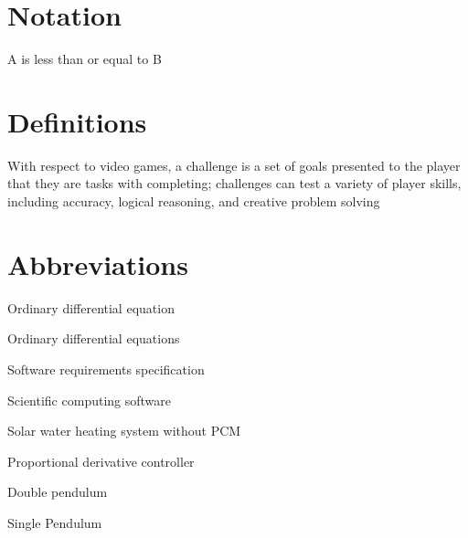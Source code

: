 
\section*{Notation}
\begin{description}[font=\rmfamily\bfseries, leftmargin=3.5cm, style=nextline]
	\item[$A \leq B$] A is less than or equal to B
\end{description}

\section*{Definitions}
\begin{description}[font=\rmfamily\bfseries, leftmargin=3.5cm, style=nextline]
	\item[Challenge] With respect to video games, a challenge is a set of goals presented to the player that they are tasks with completing; challenges can test a variety of player skills, including accuracy, logical reasoning, and creative problem solving
\end{description}

\section*{Abbreviations}
\begin{description}[font=\rmfamily\bfseries, leftmargin=3.5cm, style=nextline]
	\item[ODE] Ordinary differential equation
	\item[ODEs] Ordinary differential equations
	\item[SRS] Software requirements specification
	\item[SCS] Scientific computing software
	\item[NoPCM] Solar water heating system without PCM
	\item[PDController] Proportional derivative controller
	\item[DblPendulum] Double pendulum
	\item[SglPendulum] Single Pendulum
\end{description}